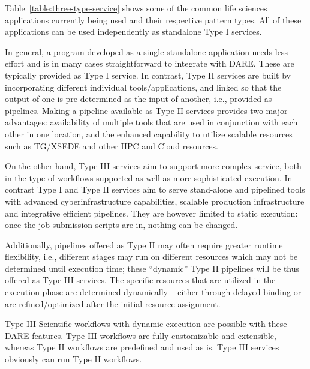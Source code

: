 \documentclass[]{svjour3}
\begin{document}
Table~\ref{table:three-type-service} shows some of the common life sciences
applications currently being used and their respective pattern types. All
of these applications can be used independently as standalone Type I services.

In general, a program developed as a single standalone application needs
less effort and is in many cases straightforward to integrate with
DARE. These are typically provided as Type I service. In contrast,
Type II services are built by incorporating different individual
tools/applications, and linked so that the output of one is
pre-determined as the input of another, i.e., provided as pipelines.
Making a pipeline available as Type II services provides
two major advantages: availability of multiple tools that are used in
conjunction with each other in one location, and the enhanced
capability to utilize scalable resources such as TG/XSEDE and other
HPC and Cloud resources.

On the other hand, Type III services aim to support more complex
service, both in the type of workflows supported as well as more
sophisticated execution. In contrast Type I and Type II
services aim to serve stand-alone and pipelined tools with
advanced cyberinfrastructure capabilities, scalable production infrastructure and
integrative efficient pipelines. They are however limited to static execution:
once the job submission scripts are in, nothing can be changed.

Additionally, pipelines offered as Type II may often require greater
runtime flexibility, i.e., different stages may run on different
resources which may not be determined until execution time; these
``dynamic'' Type II pipelines will be thus offered as Type III
services. The specific resources that are utilized in the
execution phase are determined dynamically -- either through delayed
binding or are refined/optimized after the initial resource
assignment.

Type III Scientific workflows with dynamic execution are possible with
these DARE features. Type III workflows are fully customizable and
extensible, whereas Type II workflows are predefined and used as is.
Type III services obviously can run Type II workflows.

\end{document}
